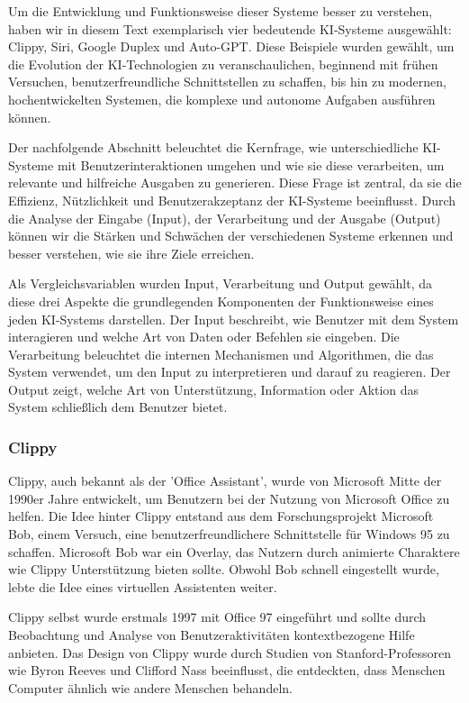 \documentclass[conference]{IEEEtran}
\begin{document}
Um die Entwicklung und Funktionsweise dieser Systeme besser zu verstehen, haben wir in diesem Text exemplarisch vier bedeutende KI-Systeme ausgewählt: Clippy, Siri, Google Duplex und Auto-GPT. Diese Beispiele wurden gewählt, um die Evolution der KI-Technologien zu veranschaulichen, beginnend mit frühen Versuchen, benutzerfreundliche Schnittstellen zu schaffen, bis hin zu modernen, hochentwickelten Systemen, die komplexe und autonome Aufgaben ausführen können.

Der nachfolgende Abschnitt beleuchtet die Kernfrage, wie unterschiedliche KI-Systeme mit Benutzerinteraktionen umgehen und wie sie diese verarbeiten, um relevante und hilfreiche Ausgaben zu generieren. Diese Frage ist zentral, da sie die Effizienz, Nützlichkeit und Benutzerakzeptanz der KI-Systeme beeinflusst. Durch die Analyse der Eingabe (Input), der Verarbeitung und der Ausgabe (Output) können wir die Stärken und Schwächen der verschiedenen Systeme erkennen und besser verstehen, wie sie ihre Ziele erreichen.

Als Vergleichsvariablen wurden Input, Verarbeitung und Output gewählt, da diese drei Aspekte die grundlegenden Komponenten der Funktionsweise eines jeden KI-Systems darstellen. Der Input beschreibt, wie Benutzer mit dem System interagieren und welche Art von Daten oder Befehlen sie eingeben. Die Verarbeitung beleuchtet die internen Mechanismen und Algorithmen, die das System verwendet, um den Input zu interpretieren und darauf zu reagieren. Der Output zeigt, welche Art von Unterstützung, Information oder Aktion das System schließlich dem Benutzer bietet.

 
\subsubsection{Clippy}
Clippy, auch bekannt als der 'Office Assistant', wurde von Microsoft Mitte der 1990er Jahre entwickelt, um Benutzern bei der Nutzung von Microsoft Office zu helfen. Die Idee hinter Clippy entstand aus dem Forschungsprojekt Microsoft Bob, einem Versuch, eine benutzerfreundlichere Schnittstelle für Windows 95 zu schaffen. Microsoft Bob war ein Overlay, das Nutzern durch animierte Charaktere wie Clippy Unterstützung bieten sollte. Obwohl Bob schnell eingestellt wurde, lebte die Idee eines virtuellen Assistenten weiter.

Clippy selbst wurde erstmals 1997 mit Office 97 eingeführt und sollte durch Beobachtung und Analyse von Benutzeraktivitäten kontextbezogene Hilfe anbieten. Das Design von Clippy wurde durch Studien von Stanford-Professoren wie Byron Reeves und Clifford Nass beeinflusst, die entdeckten, dass Menschen Computer ähnlich wie andere Menschen behandeln\cite{noauthor_media_nodate}.
\end{document}
